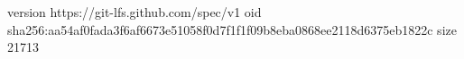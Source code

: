 version https://git-lfs.github.com/spec/v1
oid sha256:aa54af0fada3f6af6673e51058f0d7f1f1f09b8eba0868ee2118d6375eb1822c
size 21713
